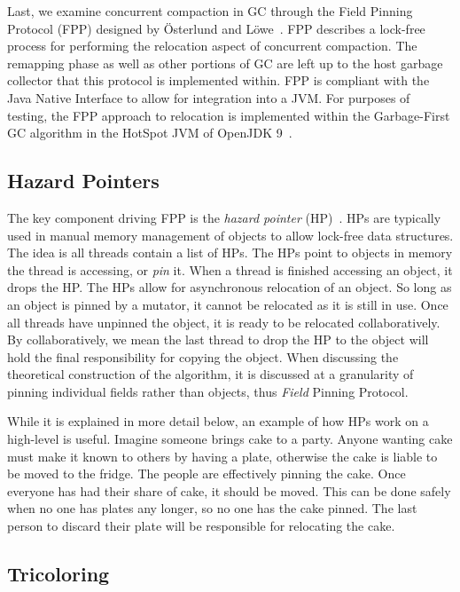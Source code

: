 \documentclass{sig-alternate}
\begin{document}
Last, we examine concurrent compaction in GC through the Field Pinning
Protocol (FPP) designed by \"{O}sterlund and L\"{o}we~\cite{Osterlund:FPP}.
FPP describes a lock-free process for performing the relocation aspect
of concurrent compaction. The remapping phase as well as other portions
of GC are left up to the host garbage collector that this
protocol is implemented within. FPP is compliant with the Java Native Interface
to allow for integration into a JVM. For purposes of testing, the FPP approach to
relocation is implemented within the Garbage-First GC algorithm in the HotSpot JVM 
of OpenJDK 9~\cite{Detlefs:G1}.


\subsection{Hazard Pointers}
\label{sec:fppHazard}

The key component driving FPP is the \emph{hazard pointer} (HP)~\cite{Osterlund:FPP}. HPs
are typically used in manual memory management of objects to allow lock-free 
data structures. The idea is all threads contain a list of HPs.
The HPs point to objects in memory the thread is accessing, or \emph{pin} it.
When a thread is finished accessing an object, it drops the HP.
The HPs allow for asynchronous relocation of an object. So long as an object
is pinned by a mutator, it cannot be relocated as it is still in use. Once all threads have
unpinned the object, it is ready to be relocated collaboratively.
By collaboratively, we mean the last thread to drop the HP to the object
will hold the final responsibility for copying the object.
When discussing the theoretical construction of the algorithm, it is discussed
at a granularity of pinning individual fields rather than objects, thus \emph{Field} Pinning
Protocol. 

While it is explained in more detail below, an example of how HPs 
work on a high-level is useful. Imagine someone brings cake to a party. Anyone 
wanting cake must make it known to others by having a plate, otherwise the 
cake is liable to be moved to the fridge. The people are effectively pinning the cake.
Once everyone has had their share of cake, it should be moved. This can
be done safely when no one has plates any longer, so no one has the cake pinned.
The last person to discard their plate will be responsible for relocating the cake.


\subsection{Tricoloring}
\label{sec:fppColoring}
\end{document}
